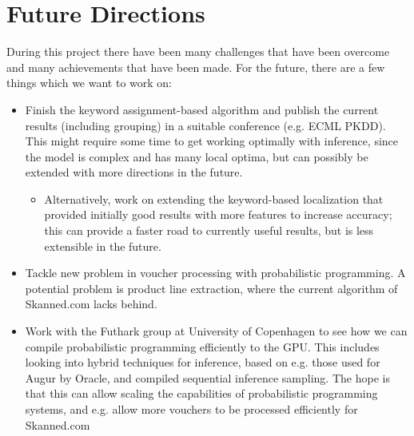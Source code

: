 \documentclass[12pt,a4paper]{article}
\begin{document}
\section{Future Directions}
During this project there have been many challenges that have been overcome and
many achievements that have been made.
For the future, there are a few things which we want to work on:
\begin{itemize}
\item Finish the keyword assignment-based algorithm and publish the current
  results (including grouping) in a suitable conference (e.g. ECML PKDD). This
  might require some time to get working optimally with inference, since the
  model is complex and has many local optima, but can possibly be extended with
  more directions in the future.
  \begin{itemize}
  \item Alternatively, work on extending the
  keyword-based localization that provided initially good results with more
  features to increase accuracy; this can provide a faster road to currently useful
  results, but is less extensible in the future.
  \end{itemize}
\item Tackle new problem in voucher processing with probabilistic programming. A
  potential problem is product line extraction, where the current algorithm of
  Skanned.com lacks behind.
\item Work with the Futhark group at University of Copenhagen to see how we can
  compile probabilistic programming efficiently to the GPU. This includes
  looking into hybrid techniques for inference, based on e.g. those used for
  Augur by Oracle, and compiled sequential inference sampling. The hope is that
  this can allow scaling the capabilities of probabilistic programming systems,
  and e.g. allow more vouchers to be processed efficiently for Skanned.com
\end{itemize}

\medskip

\printbibliography[
heading=bibintoc,
title={Bibliography}
] 

\clearpage
\end{document}
